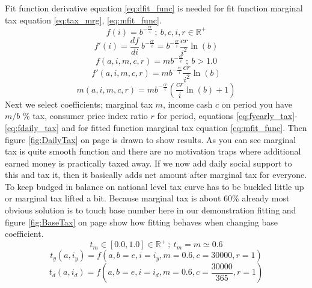 Fit function derivative equation \ref{eq:dfit_func} is needed for
fit function marginal tax equation \ref{eq:tax_mrg}, \ref{eq:mfit_func}.
\begin{equation} \label{eq:fit_simp}
 f(i) = b^{-\frac{cr}i} ~;~ b,c,i,r \in \mathbb{R}^+
\end{equation}
\begin{equation} \label{eq:fit_deri}
 f'(i) = \frac{df}{di}~b^{-\frac{cr}i} = b^{-\frac{cr}i} \frac{cr}{i^2}\ln(b) 
\end{equation}
\begin{equation} \label{eq:fit_func}
 f(a,i,m,c,r) = m b^{-\frac{cr}i} ~;~ b > 1.0
\end{equation}
\begin{equation} \label{eq:dfit_func}
 f'(a,i,m,c,r) = m b^{-\frac{cr}i}\frac{cr}{i^2}\ln(b)
\end{equation}
\begin{equation} \label{eq:mfit_func}
 m(a,i,m,c,r) = m b^{-\frac{cr}i}(\frac{cr}i\ln(b)+1)
\end{equation}
Next we select coefficients; marginal tax $m$, income cash $c$ on period you have $m/b$ \% tax,
consumer price index ratio $r$ for period, equations \ref{eq:fyearly_tax}-\ref{eq:fdaily_tax}
and for fitted function marginal tax equation \ref{eq:mfit_func}.
Then figure \ref{fig:DailyTax} on page \pageref{fig:DailyTax} is drawn to show results.
As you can see marginal tax is quite smooth function
and there are no motivation traps where additional earned money is practically taxed away.
If we now add daily social support to this and tax it,
then it basically adds net amount after marginal tax for everyone.
To keep budged in balance on national level
tax curve has to be buckled little up or marginal tax lifted a bit.
Because marginal tax is about 60\% already
most obvious solution is to touch base number here in our demonstration fitting
and figure \ref{fig:BaseTax} on page \pageref{fig:BaseTax}
show how fitting behaves when changing base coefficient.
\begin{equation} \label{eq:tax_max}
t_m \in [0.0,1.0] \in \mathbb{R}^+ ~;~ t_m = m \simeq 0.6
\end{equation}
\begin{equation} \label{eq:fyearly_tax}
t_y(a,i_y)=f(a,b=e,i=i_y,m=0.6,c=30000,r=1)
\end{equation}
\begin{equation} \label{eq:fdaily_tax}
t_d(a,i_d)=f(a,b=e,i=i_d,m=0.6,c=\frac{30000}{365},r=1)
\end{equation}

